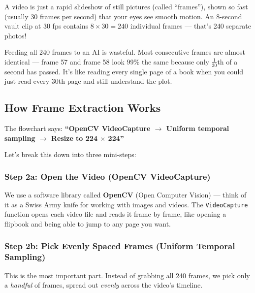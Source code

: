 \documentclass[12pt, a4paper]{article}
\begin{document}
\begin{analogybox}
A video is just a rapid slideshow of still pictures (called ``frames''), shown so fast (usually 30 frames per second) that your eyes see smooth motion. An 8-second vault clip at 30 fps contains $8 \times 30 = 240$ individual frames — that's 240 separate photos!

Feeding all 240 frames to an AI is wasteful. Most consecutive frames are almost identical — frame 57 and frame 58 look 99\% the same because only $\frac{1}{30}$th of a second has passed. It's like reading every single page of a book when you could just read every 30th page and still understand the plot.
\end{analogybox}

\subsection{How Frame Extraction Works}

The flowchart says: \textbf{``OpenCV VideoCapture $\rightarrow$ Uniform temporal sampling $\rightarrow$ Resize to 224 $\times$ 224''}

Let's break this down into three mini-steps:

\subsubsection{Step 2a: Open the Video (OpenCV VideoCapture)}

\begin{keybox}
We use a software library called \textbf{OpenCV} (Open Computer Vision) — think of it as a Swiss Army knife for working with images and videos. The \texttt{VideoCapture} function opens each video file and reads it frame by frame, like opening a flipbook and being able to jump to any page you want.
\end{keybox}

\subsubsection{Step 2b: Pick Evenly Spaced Frames (Uniform Temporal Sampling)}

This is the most important part. Instead of grabbing all 240 frames, we pick only a \textit{handful} of frames, spread out \textit{evenly} across the video's timeline.
\end{document}
